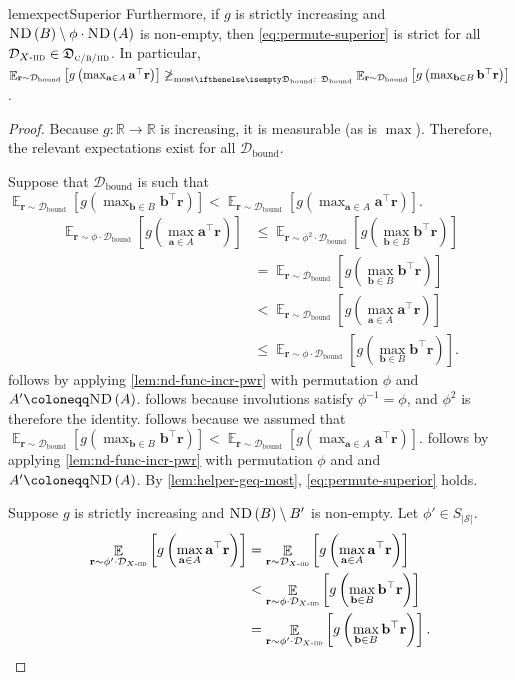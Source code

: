 \documentclass{article}
\renewcommand{\abs}[1]{\left|#1\right|}
\newcommand*{\prn}[1]{\left(#1\right)}
\newcommand*{\brx}[1]{\left[#1\right]}
\newcommand*{\defeq}{\coloneqq} %
\newcommand*{\av}{\mathbf{a}}
\newcommand*{\bv}{\mathbf{b}}
\newcommand*{\reals}{\mathbb{R}}
\newcommand*{\upsc}[1]{\text{\upshape\textsc{#1}}}
\newcommand*{\St}{\mathcal{S}}
\newcommand*{\rf}{\mathbf{r}} %
\newcommand*{\D}{\mathcal{D}} %
\newcommand*{\distSet}{\mathfrak{D}}
\newcommand*{\DSetBCiid}{\distSet_{\textsc{c/b/}\iid}}
\newcommand*{\Dbd}{\D_{\text{bound}}}
\newcommand*{\DSetBd}{\distSet_\text{bound}}
\DeclareMathOperator*{\opE}{\mathbb{E}}
\newcommand*{\E}[2]{\opE_{#1}\brx{#2}} %
\newcommand*{\ND}[1]{\upsc{ND}\prn{#1}}
\newcommand*{\inv}{^{-1}}
\newcommand*{\mdpPermGroup}{S_{\abs{\St}}}
\theoremstyle{definition}
\begin{document}
\begin{appendices}
\begin{restatable}{lem}{expectSuperior}
Furthermore, if $g$ is strictly increasing and $\ND{B}\setminus \phi\cdot \ND{A}$ is non-empty, then \cref{eq:permute-superior} is strict for all $\Diid\in\DSetBCiid$. In particular, $\E{\rf \sim \Dbd}{g\prn{\max_{\av\in A}\av^\top \rf}}\not\geqMost[][\DSetBd]  \E{\rf \sim \Dbd}{g\prn{\max_{\bv\in B}\bv^\top \rf}}$.
\end{restatable}
\begin{proof}
Because $g:\reals\to\reals$ is increasing, it is measurable (as is $\max$). Therefore, the relevant expectations exist for all $\Dbd$.

Suppose that $\Dbd$ is such that $\E{\rf \sim \Dbd}{g\prn{\max_{\bv\in B}\bv^\top \rf}}< \E{\rf \sim \Dbd}{g\prn{\max_{\av\in A}\av^\top \rf}}$. 
\begin{align}
    \E{\rf \sim \phi\cdot \Dbd}{g\prn{\max_{\av\in A}\av^\top \rf}}&\leq\E{\rf \sim \phi^2\cdot \Dbd}{g\prn{\max_{\bv\in B}\bv^\top \rf}}\label{eq:first-leq}\\
    &=\E{\rf \sim \Dbd}{g\prn{\max_{\bv\in B}\bv^\top \rf}}\label{eq:involve}\\
    &<\E{\rf \sim \Dbd}{g\prn{\max_{\av\in A}\av^\top \rf}}\label{eq:superior-leq}\\
    &\leq  \E{\rf \sim \phi\cdot \Dbd}{g\prn{\max_{\bv\in B}\bv^\top \rf}}.\label{eq:second-leq}
\end{align}
 follows by applying \cref{lem:nd-func-incr-pwr} with permutation $\phi$ and $A'\defeq \ND{A}$.  follows because involutions satisfy $\phi\inv=\phi$, and $\phi^2$ is therefore the identity.  follows because we assumed that $\E{\rf \sim \Dbd}{g\prn{\max_{\bv\in B}\bv^\top \rf}}< \E{\rf \sim \Dbd}{g\prn{\max_{\av\in A}\av^\top \rf}}$.  follows by applying \cref{lem:nd-func-incr-pwr} with permutation $\phi$ and and $A'\defeq \ND{A}$. By \cref{lem:helper-geq-most}, \cref{eq:permute-superior} holds.

Suppose $g$ is strictly increasing and $\ND{B}\setminus B'$ is non-empty. Let $\phi'\in\mdpPermGroup$.
\begin{align}
\E{\rf \sim \phi'\cdot \Diid}{g\prn{\max_{\av\in A}\av^\top \rf}}&=\E{\rf \sim \Diid}{g\prn{\max_{\av\in A}\av^\top \rf}}\label{eq:same-iid-dist-exp}\\
&<\E{\rf \sim \phi\cdot \Diid}{g\prn{\max_{\bv\in B}\bv^\top \rf}}\label{eq:sim-iid-exp}\\
&=\E{\rf \sim \phi'\cdot \Diid}{g\prn{\max_{\bv\in B}\bv^\top \rf}}.\label{eq:same-iid-dist-exp-2}
\end{align}


\end{proof}
\end{appendices}
\end{document}
